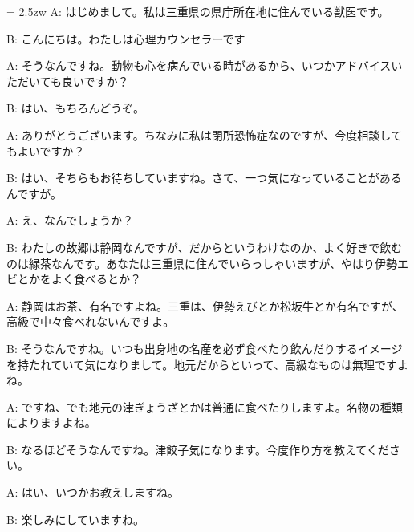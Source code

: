 \documentclass[11pt]{amsart}
\title{}
\author{}
\newenvironment{hangall}[1]{\hangindent = 2.5zw\everypar{\hangindent = 2.5zw}}{}
\begin{document}
\maketitle
\begin{hangall}{}%
A: はじめまして。私は三重県の県庁所在地に住んでいる獣医です。

B: こんにちは。わたしは心理カウンセラーです

A: そうなんですね。動物も心を病んでいる時があるから、いつかアドバイスいただいても良いですか？

B: はい、もちろんどうぞ。

A: ありがとうございます。ちなみに私は閉所恐怖症なのですが、今度相談してもよいですか？

B: はい、そちらもお待ちしていますね。さて、一つ気になっていることがあるんですが。

A: え、なんでしょうか？

B: わたしの故郷は静岡なんですが、だからというわけなのか、よく好きで飲むのは緑茶なんです。あなたは三重県に住んでいらっしゃいますが、やはり伊勢エビとかをよく食べるとか？

A: 静岡はお茶、有名ですよね。三重は、伊勢えびとか松坂牛とか有名ですが、高級で中々食べれないんですよ。

B: そうなんですね。いつも出身地の名産を必ず食べたり飲んだりするイメージを持たれていて気になりまして。地元だからといって、高級なものは無理ですよね。

A: ですね、でも地元の津ぎょうざとかは普通に食べたりしますよ。名物の種類によりますよね。

B: なるほどそうなんですね。津餃子気になります。今度作り方を教えてください。

A: はい、いつかお教えしますね。

B: 楽しみにしていますね。
\end{hangall}
\end{document}
